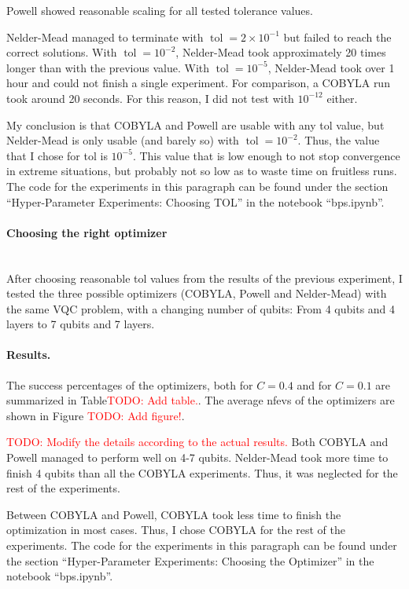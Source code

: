 \documentclass[a4paper,12pt]{article}
\newcommand{\mytodo}[1]{\textcolor{red}{TODO: #1}}
\newcommand{\e}[1]{ 10^{#1}}
\DeclareMathOperator{\tol}{tol}
\begin{document}
Powell showed reasonable scaling for all tested tolerance values.

Nelder-Mead managed to terminate with $\tol=2 \times \e{-1}$ but failed to reach the correct solutions.
With $\tol=\e{-2}$, Nelder-Mead took approximately 20 times longer than with the previous value.
With $\tol=\e{-5}$, Nelder-Mead took over 1 hour and could not finish a single experiment. For comparison, a COBYLA run took around 20 seconds.
For this reason, I did not test with $\e{-12}$ either.

My conclusion is that COBYLA and Powell are usable with any tol value, but Nelder-Mead is only usable (and barely so) with $\tol=\e{-2}$.
Thus, the value that I chose for tol is $\e{-5}$. This value that is low enough to not stop convergence in extreme situations, but probably not so low as to waste time on fruitless runs.
The code for the experiments in this paragraph can be found under the section ``Hyper-Parameter Experiments: Choosing TOL'' in the notebook ``bps.ipynb''.

\paragraph*{Choosing the right optimizer}~\\
After choosing reasonable tol values from the results of the previous experiment, I tested the three possible optimizers (COBYLA, Powell and Nelder-Mead) with the same VQC problem, with a changing number of qubits:
From 4 qubits and 4 layers to 7 qubits and 7 layers.

\paragraph*{Results.}
The success percentages of the optimizers, both for $C=0.4$ and for $C=0.1$ are summarized in Table\mytodo{Add table.}. The average nfevs of the optimizers are shown in Figure \mytodo{Add figure!}.

\mytodo{Modify the details according to the actual results.}
Both COBYLA and Powell managed to perform well on 4-7 qubits.
Nelder-Mead took more time to finish 4 qubits than all the COBYLA experiments. Thus, it was neglected for the rest of the experiments.

Between COBYLA and Powell, COBYLA took less time to finish the optimization in most cases. Thus, I chose COBYLA for the rest of the experiments.
The code for the experiments in this paragraph can be found under the section ``Hyper-Parameter Experiments: Choosing the Optimizer'' in the notebook ``bps.ipynb''.
\end{document}
